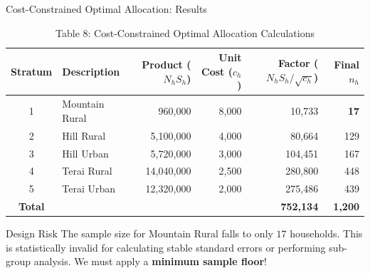 \documentclass[10pt, aspectratio=169]{beamer}
\begin{document}
  \begin{frame}{Cost-Constrained Optimal Allocation: Results}
      \begin{table}
          \caption{Table 8: Cost-Constrained Optimal Allocation Calculations}
          \footnotesize
          \begin{tabularx}{0.9\textwidth}{clrrrr}
              \toprule
              \textbf{Stratum} & \textbf{Description} & \textbf{Product ($N_h S_h$)} & \textbf{Unit Cost ($c_h$)} & \textbf{Factor ($N_h S_h / \sqrt{c_h}$)} & \textbf{Final $n_h$} \\
              \midrule
              1 & Mountain Rural & 960,000 & 8,000 & 10,733 & \cellcolor{red!15}\textbf{17} \\
              2 & Hill Rural & 5,100,000 & 4,000 & 80,664 & 129 \\
              3 & Hill Urban & 5,720,000 & 3,000 & 104,451 & 167 \\
              4 & Terai Rural & 14,040,000 & 2,500 & 280,800 & 448 \\
              5 & Terai Urban & 12,320,000 & 2,000 & 275,486 & 439 \\
              \midrule
              \textbf{Total} & & & & \textbf{752,134} & \textbf{1,200} \\
              \bottomrule
          \end{tabularx}
      \end{table}
      
      \begin{alertblock}{Design Risk}
          The sample size for Mountain Rural falls to only $17$ households. This is statistically invalid for calculating stable standard errors or performing sub-group analysis. We must apply a \textbf{minimum sample floor}!
      \end{alertblock}
  \end{frame}
  
\end{document}
